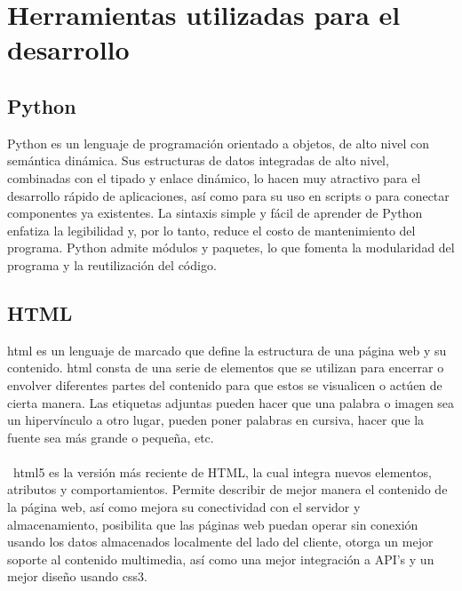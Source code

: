 \documentclass[12pt, a4paper, titlepage]{article}
\begin{document}
	\section{Herramientas utilizadas para el desarrollo}
	\subsection{Python}
	Python es un lenguaje de programación orientado a objetos, de alto nivel con semántica dinámica. Sus estructuras de datos integradas de alto nivel, combinadas con el tipado y enlace dinámico, lo hacen muy atractivo para el desarrollo rápido de aplicaciones, así como para su uso en scripts o para conectar componentes ya existentes. La sintaxis simple y fácil de aprender de Python enfatiza la legibilidad y, por lo tanto, reduce el costo de mantenimiento del programa. Python admite módulos y paquetes, lo que fomenta la modularidad del programa y la reutilización del código. \cite{refQuesPython}
	\subsection{HTML}
	\acrfull{html} es un lenguaje de marcado que define la estructura de una página web y su contenido. \acrshort{html} consta de una serie de elementos que se utilizan para encerrar o envolver diferentes partes del contenido para que estos se visualicen o actúen de cierta manera. Las etiquetas adjuntas pueden hacer que una palabra o imagen sea un hipervínculo a otro lugar, pueden poner palabras en cursiva, hacer que la fuente sea más grande o pequeña, etc. \cite{refHtml} \\\\\
	\acrshort{html}5 es la versión más reciente de HTML, la cual integra nuevos elementos, atributos y comportamientos. Permite describir de mejor manera el contenido de la página web, así como mejora su conectividad con el servidor y almacenamiento, posibilita que las páginas web puedan operar sin conexión usando los datos almacenados localmente del lado del cliente, otorga un mejor soporte al contenido multimedia, así como una mejor integración a API's y un mejor diseño usando \acrshort{css}3.	\cite{refHtml2}
\end{document}
